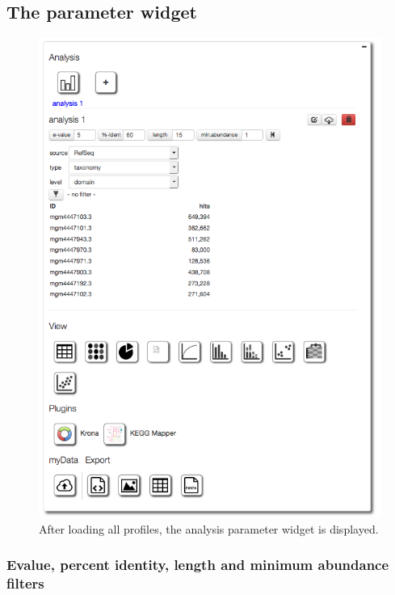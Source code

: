 \documentclass[12pt,fullpage]{report}
\begin{document}
\subsection*{The parameter widget}

\begin{figure}
\begin{center}
\includegraphics[width=6in]{Images/v4-analysis-page-parameters-initial.png}
\end{center}
\caption{
After loading all profiles, the analysis parameter widget is displayed.
}
\label{fig:v4-analysis-page-parameters-initial}
\end{figure}


\subsubsection*{Evalue, percent identity, length and minimum abundance filters}
\end{document}
